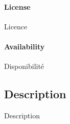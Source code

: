\paragraph{License}{Licence}

\paragraph{Availability}{Disponibilité}


\subsection{Description}{Description}




















